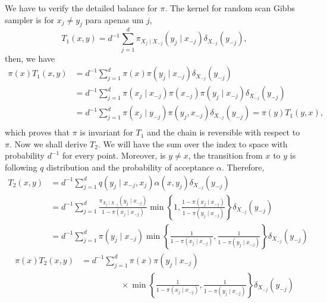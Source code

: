 \documentclass[a4paper,12pt]{article}
\theoremstyle{definition}
\begin{document}
\begin{enumerate}
    We have to verify the detailed balance for $\pi$. The kernel for 
    random scan Gibbs sampler is for $x_j \neq y_j$ para apenas um $j$,  
    $$T_1(x,y) = d^{-1}\sum_{j=1}^d\pi_{X_j\mid X_{-j}}(y_j \mid x_{-j})
    \delta_{X_{-j}}(y_{-j}),$$
    then, we have
    \begin{equation*}
        \begin{split}
            \pi(x)T_1(x,y) &= d^{-1}\sum_{j=1}^d \pi(x)\pi(y_j\mid x_{-j})\delta_{X_{-j}}(y_{-j}) \\
            &=  d^{-1}\sum_{j=1}^d \pi(x_{j}\mid x_{-j})\pi(x_{-j})\pi(y_j\mid x_{-j})\delta_{X_{-j}}(y_{-j}) \\
            &=  d^{-1}\sum_{j=1}^d \pi(x_{j}\mid y_{-j})\pi(y_j, x_{-j})\delta_{X_{-j}}(y_{-j}) = \pi(y)T_1(y,x),\\
        \end{split}
    \end{equation*}
    which proves that $\pi$ is invariant for $T_1$ and the chain is reversible
    with respect to $\pi$. Now we shall derive $T_2$. We will have the sum
    over the index to space with probability $d^{-1}$ for every point.
    Moreover, is $y \neq x$, the transition from $x$ to $y$ is following $q$
    distribution and the probability of acceptance $\alpha$. Therefore, 
    \begin{equation*}
        \begin{split}
            T_2(x,y) &= d^{-1}\sum_{j=1}^d q(y_j\mid x_{-j}, x_j)\alpha(x, y_j)\delta_{X_{-j}}(y_{-j}) \\
            &= d^{-1}\sum_{j=1}^d \frac{\pi_{X_j\mid X_{-j}}(y_j \mid x_{-j})}{1-\pi(x_j \mid x_{-j})}     
            \min\left\{1, \frac{1-\pi(x_j\mid x_{-j})}{1-\pi(y_j\mid x_{-j})}\right\}\delta_{X_{-j}}(y_{-j}) \\
            &= d^{-1}\sum_{j=1}^d \pi(y_j \mid x_{-j})     
            \min\left\{\frac{1}{1-\pi(x_j \mid x_{-j})}, \frac{1}{1-\pi(y_j\mid x_{-j})}\right\}\delta_{X_{-j}}(y_{-j})
        \end{split}
    \end{equation*}
    \begin{equation*}
        \begin{split}
            \pi(x)T_2(x,y) &= d^{-1}\sum_{j=1}^d \pi(x)\pi(y_j \mid x_{-j})  \\
            &\hspace{2cm}\times\min\left\{\frac{1}{1-\pi(x_j \mid x_{-j})}, \frac{1}{1-\pi(y_j\mid x_{-j})}\right\}\delta_{X_{-j}}(y_{-j}) \\

\end{split}
\end{equation*}
\end{enumerate}
\end{document}

